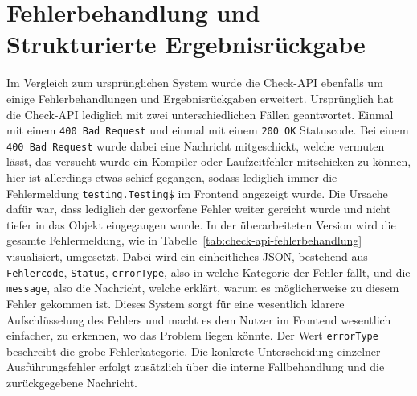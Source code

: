 \section{Fehlerbehandlung und Strukturierte Ergebnisrückgabe}
Im Vergleich zum ursprünglichen System wurde die Check-API ebenfalls um einige Fehlerbehandlungen und Ergebnisrückgaben erweitert. Ursprünglich hat die Check-API lediglich mit zwei unterschiedlichen Fällen geantwortet. Einmal mit einem \texttt{400 Bad Request} und einmal mit einem \texttt{200 OK} Statuscode. Bei einem \texttt{400 Bad Request} wurde dabei eine Nachricht mitgeschickt, welche vermuten lässt, das versucht wurde ein Kompiler oder Laufzeitfehler mitschicken zu können, hier ist allerdings etwas schief gegangen, sodass lediglich immer die Fehlermeldung \texttt{testing.Testing\$} im Frontend angezeigt wurde. Die Ursache dafür war, dass lediglich der geworfene Fehler weiter gereicht wurde und nicht tiefer in das Objekt eingegangen wurde. In der überarbeiteten Version wird die gesamte Fehlermeldung, wie in Tabelle~\ref{tab:check-api-fehlerbehandlung} visualisiert, umgesetzt. Dabei wird ein einheitliches JSON, bestehend aus \texttt{Fehlercode}, \texttt{Status}, \texttt{errorType}, also in welche Kategorie der Fehler fällt, und die \texttt{message}, also die Nachricht, welche erklärt, warum es möglicherweise zu diesem Fehler gekommen ist. Dieses System sorgt für eine wesentlich klarere Aufschlüsselung des Fehlers und macht es dem Nutzer im Frontend wesentlich einfacher, zu erkennen, wo das Problem liegen könnte. Der Wert \texttt{errorType} beschreibt die grobe Fehlerkategorie. Die konkrete Unterscheidung einzelner Ausführungsfehler erfolgt zusätzlich über die interne Fallbehandlung und die zurückgegebene Nachricht.

